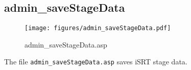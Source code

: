 \subsection{admin\_saveStageData}
\begin{figure}[htb]
    \begin{center}
        \texttt{[image: figures/admin\_saveStageData.pdf]}
    \end{center}
    \caption{admin\_saveStageData.asp}
    \label{fig:admin_saveStageData}
\end{figure}

The file \verb|admin_saveStageData.asp| saves iSRT stage data.
